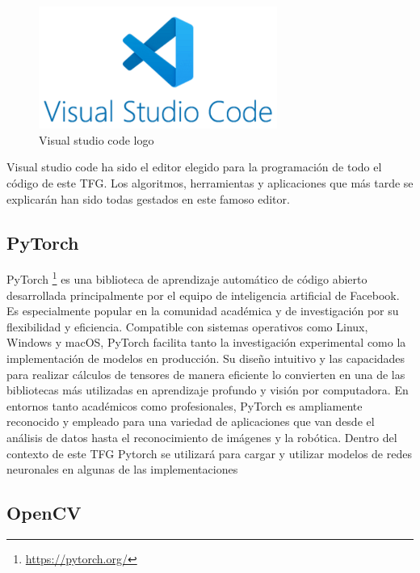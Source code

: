 \begin{figure} [H]
	\begin{center}
	\includegraphics[height=4cm]{imagenes/cap3/vsc-logo.png}
	\end{center}
	\caption[carla to ros bridge]{Visual studio code logo}
	\label{fig:vcs logo}
\end{figure}

Visual studio code ha sido el editor elegido para la programación de todo el código de este \ac{TFG}. Los algoritmos, herramientas y aplicaciones que más tarde se explicarán han sido todas gestados en este famoso editor.

\subsection{PyTorch}
\label{subsec:PyTorch}

PyTorch \footnote{\url{https://pytorch.org/}} es una biblioteca de aprendizaje automático de código abierto desarrollada principalmente por el equipo de inteligencia artificial de Facebook. Es especialmente popular en la comunidad académica y de investigación por su flexibilidad y eficiencia. Compatible con sistemas operativos como Linux, Windows y macOS, PyTorch facilita tanto la investigación experimental como la implementación de modelos en producción. Su diseño intuitivo y las capacidades para realizar cálculos de tensores de manera eficiente lo convierten en una de las bibliotecas más utilizadas en aprendizaje profundo y visión por computadora. En entornos tanto académicos como profesionales, PyTorch es ampliamente reconocido y empleado para una variedad de aplicaciones que van desde el análisis de datos hasta el reconocimiento de imágenes y la robótica. Dentro del contexto de este \ac{TFG} Pytorch se utilizará para cargar y utilizar modelos de redes neuronales en algunas de las implementaciones

\subsection{OpenCV}
\label{subsec:OpenCV}

